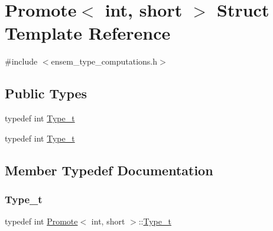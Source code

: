 \hypertarget{structPromote_3_01int_00_01short_01_4}{}\section{Promote$<$ int, short $>$ Struct Template Reference}
\label{structPromote_3_01int_00_01short_01_4}


{\ttfamily \#include $<$ensem\+\_\+type\+\_\+computations.\+h$>$}

\subsection*{Public Types}
\begin{DoxyCompactItemize}
\item 
typedef int \mbox{\hyperlink{structPromote_3_01int_00_01short_01_4_aeccdff5aed8403672c3c04fc17570d5e}{Type\+\_\+t}}
\item 
typedef int \mbox{\hyperlink{structPromote_3_01int_00_01short_01_4_aeccdff5aed8403672c3c04fc17570d5e}{Type\+\_\+t}}
\end{DoxyCompactItemize}


\subsection{Member Typedef Documentation}
\mbox{\label{structPromote_3_01int_00_01short_01_4_aeccdff5aed8403672c3c04fc17570d5e}} 
\subsubsection{\texorpdfstring{Type\_t}{Type\_t}\hspace{0.1cm}{\footnotesize\ttfamily [1/2]}}
{\footnotesize\ttfamily typedef int \mbox{\hyperlink{structPromote}{Promote}}$<$ int, short $>$\+::\mbox{\hyperlink{structPromote_3_01int_00_01short_01_4_aeccdff5aed8403672c3c04fc17570d5e}{Type\+\_\+t}}}

\mbox{\label{structPromote_3_01int_00_01short_01_4_aeccdff5aed8403672c3c04fc17570d5e}} 
